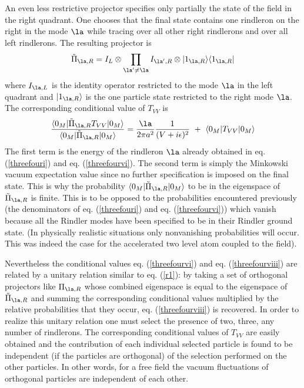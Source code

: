 \documentclass[12pt]{article}
\begin{document}
An even less restrictive projector  specifies only partially
the state of the field in the right quadrant. One chooses
that the final state contains one rindleron on the right in the mode $\la$
while tracing over all other right rindlerons and over all left rindlerons.
The resulting projector is
\begin{equation} \tilde \Pi_{\la,R}  =
I_{L} \otimes \prod_{\la^\prime \neq \la}
I_{\la^\prime,R}\otimes \ket{1_{\la,R}}\bra{1_{\la,R}}  \label{threefourvii}
\end{equation}
where $I_{\la,L}$ is the identity operator restricted to the
mode $\la$ in the left quadrant and $\ket{1_{\la, R}}$ is
the one particle state restricted to the right mode $\la$.
The
corresponding conditional value of $T_{VV}$ is \begin{eqnarray} {
\expect{0_M}{\tilde \Pi_{\la,R} T_{VV}}{0_M} \over \expect{0_M}{\tilde
\Pi_{\la,R}}{0_M}} =
{\la \over 2 \pi
a^2}{1 \over (V + i \e)^2} \ + \  \expect{0_M}{T_{VV}}{0_M}
\label{threefourviii} \end{eqnarray}
The first term is the energy of the rindleron $\la$ already obtained
in eq. (\ref{threefouri}) and eq. (\ref{threefourvi}). The second term
is simply the Minkowski vacuum expectation value since no further
specification is imposed on the final state.
This is why the probability $\expect{0_M}{\tilde
\Pi_{\la,R}}{0_M}$ to be in the eigenspace of $\tilde
\Pi_{\la,R}$ is finite. This is to be opposed to the probabilities
encountered previously (the denominators of eq. (\ref{threefouri}) and
eq. (\ref{threefourvi})) which
vanish because all the Rindler modes have been
specified
to be in their Rindler ground state.
(In physically realistic situations  only
nonvanishing probabilities
will occur. This was indeed the case for the accelerated two level atom
coupled to the field).

 Nevertheless the conditional values eq.
(\ref{threefourvi}) and eq. (\ref{threefourviii}) are related by a
unitary relation similar to eq. (\ref{r1}): by taking a set
of orthogonal projectors like $\Pi_{\la,R}$ whose combined eigenspace
is equal to the eigenspace of
$\tilde \Pi_{\la,R}$
and summing
the corresponding
conditional values multiplied by the relative probabilities that they occur,
eq. (\ref{threefourviii}) is recovered. In order to realize this unitary
relation one must select
the presence of two, three, any number of rindlerons.
The corresponding
conditional values of $T_{VV}$ are easily obtained and the contribution of each
individual selected particle is found to be independent
(if the particles are orthogonal) of the selection performed
on the other particles. In other words, for a free field the vacuum
fluctuations of orthogonal particles are independent of each other.
\end{document}
